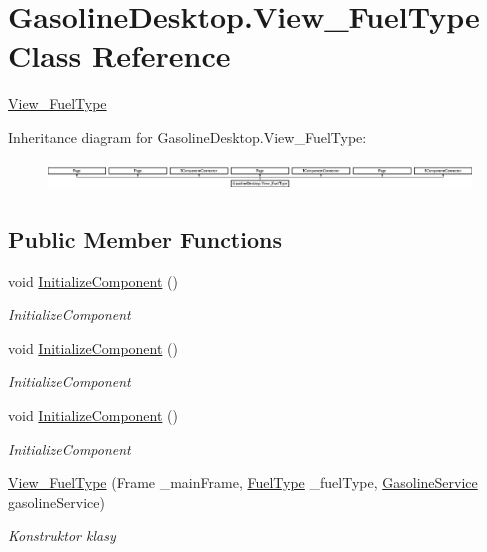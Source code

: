 \hypertarget{class_gasoline_desktop_1_1_view___fuel_type}{}\section{Gasoline\+Desktop.\+View\+\_\+\+Fuel\+Type Class Reference}
\label{class_gasoline_desktop_1_1_view___fuel_type}


\mbox{\hyperlink{class_gasoline_desktop_1_1_view___fuel_type}{View\+\_\+\+Fuel\+Type}}  


Inheritance diagram for Gasoline\+Desktop.\+View\+\_\+\+Fuel\+Type\+:\begin{figure}[H]
\begin{center}
\leavevmode
\includegraphics[height=0.776699cm]{class_gasoline_desktop_1_1_view___fuel_type}
\end{center}
\end{figure}
\subsection*{Public Member Functions}
\begin{DoxyCompactItemize}
\item 
void \mbox{\hyperlink{class_gasoline_desktop_1_1_view___fuel_type_aaf7734cbe0b913479e0cfd6596026939}{Initialize\+Component}} ()
\begin{DoxyCompactList}\small\item\em Initialize\+Component \end{DoxyCompactList}\item 
void \mbox{\hyperlink{class_gasoline_desktop_1_1_view___fuel_type_aaf7734cbe0b913479e0cfd6596026939}{Initialize\+Component}} ()
\begin{DoxyCompactList}\small\item\em Initialize\+Component \end{DoxyCompactList}\item 
void \mbox{\hyperlink{class_gasoline_desktop_1_1_view___fuel_type_aaf7734cbe0b913479e0cfd6596026939}{Initialize\+Component}} ()
\begin{DoxyCompactList}\small\item\em Initialize\+Component \end{DoxyCompactList}\item 
\mbox{\hyperlink{class_gasoline_desktop_1_1_view___fuel_type_a229dafba873cba4a45cd62915b883c12}{View\+\_\+\+Fuel\+Type}} (Frame \+\_\+main\+Frame, \mbox{\hyperlink{class_gasoline_desktop_1_1_fuel_type}{Fuel\+Type}} \+\_\+fuel\+Type, \mbox{\hyperlink{class_gasoline_desktop_1_1_gasoline_service}{Gasoline\+Service}} gasoline\+Service)
\begin{DoxyCompactList}\small\item\em Konstruktor klasy \end{DoxyCompactList}\end{DoxyCompactItemize}


